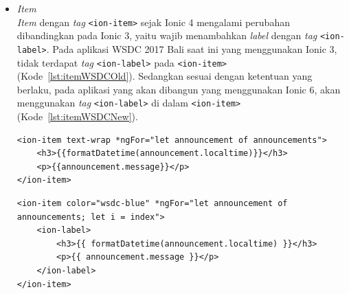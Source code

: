 \begin{enumerate}
\begin{enumerate}
\begin{itemize}
		\item \textit{Item} \\
		\textit{Item} dengan \textit{tag} \texttt{<ion-item>} sejak Ionic 4 mengalami perubahan dibandingkan pada Ionic 3, yaitu wajib menambahkan \textit{label} dengan \textit{tag} \texttt{<ion-label>}. Pada aplikasi WSDC 2017 Bali saat ini yang menggunakan Ionic 3, tidak terdapat \textit{tag} \texttt{<ion-label>} pada \texttt{<ion-item>} (Kode~\ref{lst:itemWSDCOld}). Sedangkan sesuai dengan ketentuan yang berlaku, pada aplikasi yang akan dibangun yang menggunakan Ionic 6, akan menggunakan \textit{tag} \texttt{<ion-label>} di dalam \texttt{<ion-item>} (Kode~\ref{lst:itemWSDCNew}).
		
\begin{lstlisting}[label={lst:itemWSDCOld}, caption=\textit{Tag} \texttt{<ion-item>} dengan Ionic 3 di Aplikasi WSDC 2017 Bali Saat Ini]
<ion-item text-wrap *ngFor="let announcement of announcements">
	<h3>{{formatDatetime(announcement.localtime)}}</h3>
    <p>{{announcement.message}}</p>
</ion-item>
\end{lstlisting}

\begin{lstlisting}[label={lst:itemWSDCNew}, caption=\textit{Tag} <ion-item> dengan Ionic 6 di Aplikasi WSDC 2017 Bali yang Akan dibuat]
<ion-item color="wsdc-blue" *ngFor="let announcement of announcements; let i = index">
    <ion-label>
    	<h3>{{ formatDatetime(announcement.localtime) }}</h3>
        <p>{{ announcement.message }}</p>
    </ion-label>
</ion-item>
\end{lstlisting}
		

\end{itemize}
\end{enumerate}
\end{enumerate}
